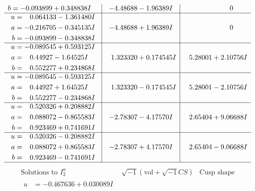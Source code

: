 \documentclass[1p]{elsarticle_modified}
\theoremstyle{definition}
\newcommand{\I}{\sqrt{-1}}
\begin{document}
$$\begin{array}{c|c|c}
\begin{aligned}
b &= -0.093899 + 0.348838 I\end{aligned}
 & -4.48688 - 1.96389 I & \phantom{-0.000000 } 0 \\ \hline\begin{aligned}
u &= \phantom{-}0.064133 - 1.361480 I \\
a &= -0.216705 - 0.345135 I \\
b &= -0.093899 - 0.348838 I\end{aligned}
 & -4.48688 + 1.96389 I & \phantom{-0.000000 } 0 \\ \hline\begin{aligned}
u &= -0.089545 + 0.593125 I \\
a &= \phantom{-}0.44927 - 1.64525 I \\
b &= \phantom{-}0.552277 + 0.234868 I\end{aligned}
 & \phantom{-}1.323320 + 0.174545 I & \phantom{-}5.28001 + 2.10756 I \\ \hline\begin{aligned}
u &= -0.089545 - 0.593125 I \\
a &= \phantom{-}0.44927 + 1.64525 I \\
b &= \phantom{-}0.552277 - 0.234868 I\end{aligned}
 & \phantom{-}1.323320 - 0.174545 I & \phantom{-}5.28001 - 2.10756 I \\ \hline\begin{aligned}
u &= \phantom{-}0.520326 + 0.208882 I \\
a &= \phantom{-}0.088072 - 0.865583 I \\
b &= \phantom{-}0.923469 + 0.741691 I\end{aligned}
 & -2.78307 - 4.17570 I & \phantom{-}2.65404 + 9.06688 I \\ \hline\begin{aligned}
u &= \phantom{-}0.520326 - 0.208882 I \\
a &= \phantom{-}0.088072 + 0.865583 I \\
b &= \phantom{-}0.923469 - 0.741691 I\end{aligned}
 & -2.78307 + 4.17570 I & \phantom{-}2.65404 - 9.06688 I\\
 \hline 
 \end{array}$$\newpage$$\begin{array}{c|c|c}  
\text{Solutions to }I^u_{2}& \I (\text{vol} + \sqrt{-1}CS) & \text{Cusp shape}\\
 \hline 
\begin{aligned}
u &= -0.467636 + 0.030089 I \\

\end{aligned}
\end{array}$$
\end{document}
